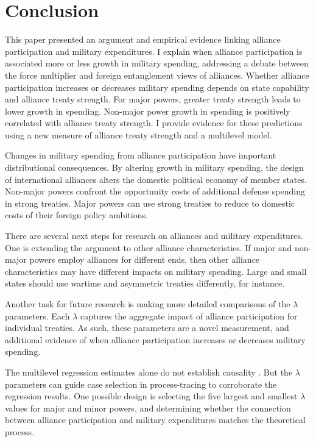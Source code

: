 \documentclass[12pt]{article}
\begin{document}
\section{Conclusion}


This paper presented an argument and empirical evidence linking alliance participation and military expenditures. 
I explain when alliance participation is associated more or less growth in military spending, addressing a debate between the force multiplier and foreign entanglement views of alliances. 
Whether alliance participation increases or decreases military spending depends on state capability and alliance treaty strength. 
For major powers, greater treaty strength leads to lower growth in spending. 
Non-major power growth in spending is positively correlated with alliance treaty strength. 
I provide evidence for these predictions using a new measure of alliance treaty strength and a multilevel model. 


Changes in military spending from alliance participation have important distributional consequences. 
By altering growth in military spending, the design of international alliances alters the domestic political economy of member states. 
Non-major powers confront the opportunity costs of additional defense spending in strong treaties.
Major powers can use strong treaties to reduce to domestic costs of their foreign policy ambitions.  


There are several next steps for research on alliances and military expenditures. 
One is extending the argument to other alliance characteristics. 
If major and non-major powers employ alliances for different ends, then other alliance characteristics may have different impacts on military spending. 
Large and small states should use wartime and asymmetric treaties differently, for instance. 


Another task for future research is making more detailed comparisons of the $\lambda$ parameters. 
Each $\lambda$ captures the aggregate impact of alliance participation for individual treaties.
As such, these parameters are a novel measurement, and additional evidence of when alliance participation increases or decreases military spending. 


The multilevel regression estimates alone do not establish causality \citep{Seawright2016}. 
But the $\lambda$ parameters can guide case selection in process-tracing to corroborate the regression results.
One possible design is selecting the five largest and smallest $\lambda$ values for major and minor powers, and determining whether the connection between alliance participation and military expenditures matches the theoretical process.
\end{document}
